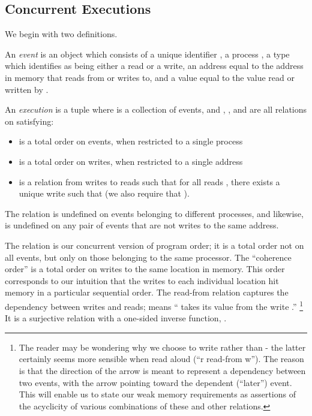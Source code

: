 \documentclass[]{eptcs}
\newenvironment{definition}[1][Definition.]{\begin{trivlist}
\item[\hskip \labelsep {\bfseries #1}]}{\end{trivlist}}
\begin{document}
\subsection{Concurrent Executions}

We begin with two definitions.

\begin{definition}
An \emph{event}  is an object which consists of a unique identifier , a process , a type  which identifies  as being either a read or a write, an address  equal to the address in memory that  reads from or writes to, and a value  equal to the value read or written by .
\end{definition}

\begin{definition}
An \emph{execution} is a tuple  where  is a collection of events, and , , and  are all relations on  satisfying:
\begin{itemize}
  \item  is a total order on events, when restricted to a single process
  \item  is a total order on writes, when restricted to a single address
  \item  is a relation from writes to reads such that for all reads , there exists a unique write  such that  (we also require that ).
\end{itemize}
The relation  is undefined on events belonging to different processes, and likewise,  is undefined on any pair of events that are not writes to the same address.
\end{definition}

The relation  is our concurrent version of program order; it is a total order not on all events, but only on those belonging to the same processor. The ``coherence order''  is a total order on writes to the same location in memory. This order corresponds to our intuition that the writes to each individual location hit memory in a particular sequential order. The read-from relation  captures the dependency between writes and reads;  means `` takes its value from the write .'' \footnote{The reader may be wondering why we choose to write  rather than  - the latter certainly seems more sensible when read aloud (``r read-from w''). The reason is that the direction of the arrow is meant to represent a dependency between two events, with the arrow pointing toward the dependent (``later'') event. This will enable us to state our weak memory requirements as assertions of the acyclicity of various combinations of these and other relations.} It is a surjective relation with a one-sided inverse function, .
\end{document}
